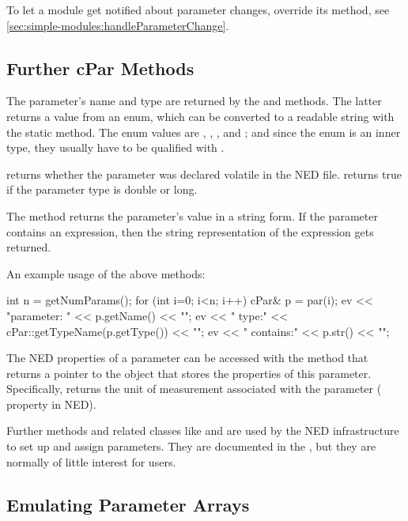 To let a module get notified about parameter changes, override
its  method, see
\ref{sec:simple-modules:handleParameterChange}.


\subsection{Further cPar Methods}

The parameter's name and type are returned by the  and
 methods. The latter returns a value from an enum,
which can be converted to a readable string with the 
static method. The enum values are , , ,
 and ; and since the enum is an inner type,
they usually have to be qualified with .

 returns whether the parameter was declared volatile
in the NED file.  returns true if the parameter
type is double or long.

The  method returns the parameter's value in a string form.
If the parameter contains an expression, then the string representation
of the expression gets returned.

An example usage of the above methods:

\begin{cpp}
int n = getNumParams();
for (int i=0; i<n; i++)
{
    cPar& p = par(i);
    ev << "parameter: " << p.getName() << "\n";
    ev << "  type:" << cPar::getTypeName(p.getType()) << "\n";
    ev << "  contains:" << p.str() << "\n";
}
\end{cpp}

The NED properties of a parameter can be accessed with the 
method that returns a pointer to the  object that stores
the properties of this parameter. Specifically,  returns
the unit of measurement associated with the parameter ( property in NED).

Further  methods and related classes like  and
 are used by the NED infrastructure to set up and
assign parameters. They are documented in the , but
they are normally of little interest for users.


\subsection{Emulating Parameter Arrays}

